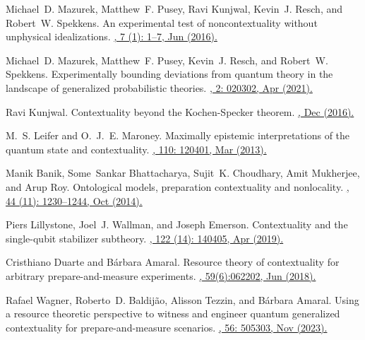 \documentclass[letterpaper,onecolumn,12pt,accepted=2024-01-17]{article}
\begin{document}
\begin{thebibliography}{100}
Michael~D. Mazurek, Matthew~F. Pusey, Ravi Kunjwal, Kevin~J. Resch, and
  Robert~W. Spekkens.
\newblock An experimental test of noncontextuality without unphysical  idealizations.
\href{https://doi.org/10.1038/ncomms11780}{, 7 (1): 1--7, Jun (2016).}

Michael~D. Mazurek, Matthew~F. Pusey, Kevin~J. Resch, and Robert~W. Spekkens.
\newblock Experimentally bounding deviations from quantum theory in the landscape of generalized probabilistic theories.
\href{https://doi.org/10.1103/PRXQuantum.2.020302}{, 2: 020302, Apr (2021).}

Ravi Kunjwal.
\newblock Contextuality beyond the {K}ochen-{S}pecker theorem.
\href{https://doi.org/10.48550/arXiv.1612.07250}{, Dec (2016).}

M.~S. Leifer and O.~J.~E. Maroney.
\newblock Maximally epistemic interpretations of the quantum state and contextuality.
\href{https://doi.org/10.1103/PhysRevLett.110.120401}{, 110: 120401, Mar (2013).}

Manik Banik, Some~Sankar Bhattacharya, Sujit~K. Choudhary, Amit Mukherjee, and
  Arup Roy.
\newblock Ontological models, preparation contextuality and nonlocality.
\href{https://doi.org/10.1007/s10701-014-9839-4}{, 44 (11): 1230--1244, Oct (2014).}

Piers Lillystone, Joel~J. Wallman, and Joseph Emerson.
\newblock Contextuality and the single-qubit stabilizer subtheory.
\href{https://doi.org/10.1103/PhysRevLett.122.140405}{, 122 (14): 140405, Apr (2019).}

Cristhiano Duarte and B\'{a}rbara Amaral.
\newblock Resource theory of contextuality for arbitrary prepare-and-measure experiments.
\href{https://doi.org/10.1063/1.5018582}{, 59(6):062202, Jun (2018).}

Rafael Wagner, Roberto~D. Baldij{\~a}o, Alisson Tezzin, and B{\'a}rbara Amaral.
\newblock Using a resource theoretic perspective to witness and engineer
  quantum generalized contextuality for prepare-and-measure scenarios.
\href{http://dx.doi.org/10.1088/1751-8121/ad0bcc}{, 56: 505303, Nov (2023).}


\end{thebibliography}
\end{document}
